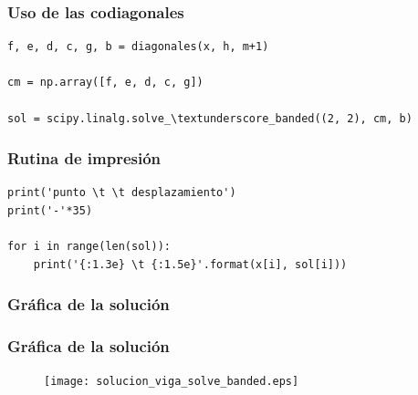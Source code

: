 \begin{frame}
\frametitle{Uso de las codiagonales}
\begin{lstlisting}[caption=Uso de las codiagonales, style=FormattedNumber, basicstyle=\linespread{1.1}\ttfamily=\small, columns=fullflexible]
f, e, d, c, g, b = diagonales(x, h, m+1)

cm = np.array([f, e, d, c, g])

sol = scipy.linalg.solve_\textunderscore_banded((2, 2), cm, b)
\end{lstlisting}
\end{frame}
\begin{frame}
\frametitle{Rutina de impresión}
\begin{lstlisting}[caption=Impresión de los resultados, style=FormattedNumber, basicstyle=\linespread{1.1}\ttfamily=\small, columns=fullflexible]
print('punto \t \t desplazamiento')
print('-'*35)

for i in range(len(sol)):
    print('{:1.3e} \t {:1.5e}'.format(x[i], sol[i]))
\end{lstlisting}
\end{frame}
\subsubsection{Gráfica de la solución}
\begin{frame}
\frametitle{Gráfica de la solución}
\vspace{-1cm}
\begin{figure}
	\centering
	\texttt{[image: solucion\_viga\_solve\_banded.eps]}
\end{figure}
\end{frame}
